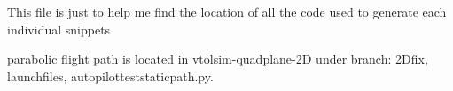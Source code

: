 This file is just to help me find the location of all the code used to generate each individual snippets

parabolic flight path is located in vtolsim-quadplane-2D under branch: 2Dfix, launchfiles, autopilotteststaticpath.py.


